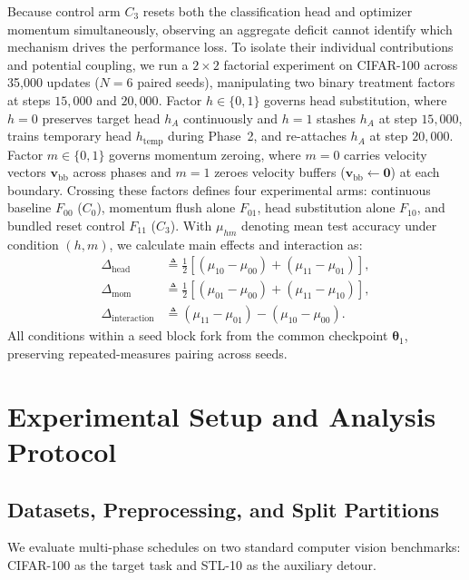 \documentclass[sn-mathphys,Numbered]{sn-jnl}
\begin{document}
Because control arm $C_3$ resets both the classification head and optimizer momentum simultaneously, observing an aggregate deficit cannot identify which mechanism drives the performance loss. To isolate their individual contributions and potential coupling, we run a $2 \times 2$ factorial experiment on CIFAR-100 across 35,000 updates ($N = 6$ paired seeds), manipulating two binary treatment factors at steps $15{,}000$ and $20{,}000$. Factor $h \in \{0, 1\}$ governs head substitution, where $h = 0$ preserves target head $h_A$ continuously and $h = 1$ stashes $h_A$ at step $15{,}000$, trains temporary head $h_{\mathrm{temp}}$ during Phase~2, and re-attaches $h_A$ at step $20{,}000$. Factor $m \in \{0, 1\}$ governs momentum zeroing, where $m = 0$ carries velocity vectors $\bm{v}_{\mathrm{bb}}$ across phases and $m = 1$ zeroes velocity buffers ($\bm{v}_{\mathrm{bb}} \leftarrow \mathbf{0}$) at each boundary. Crossing these factors defines four experimental arms: continuous baseline $F_{00}$ ($C_0$), momentum flush alone $F_{01}$, head substitution alone $F_{10}$, and bundled reset control $F_{11}$ ($C_3$). With $\mu_{hm}$ denoting mean test accuracy under condition $(h, m)$, we calculate main effects and interaction as:
\begin{align}
    \Delta_{\mathrm{head}} &\triangleq \frac{1}{2} \left[ (\mu_{10} - \mu_{00}) + (\mu_{11} - \mu_{01}) \right], \label{eq:factorial_head} \\
    \Delta_{\mathrm{mom}}  &\triangleq \frac{1}{2} \left[ (\mu_{01} - \mu_{00}) + (\mu_{11} - \mu_{10}) \right], \label{eq:factorial_mom} \\
    \Delta_{\mathrm{interaction}} &\triangleq (\mu_{11} - \mu_{01}) - (\mu_{10} - \mu_{00}). \label{eq:factorial_interaction}
\end{align}
All conditions within a seed block fork from the common checkpoint $\bm{\theta}_1$, preserving repeated-measures pairing across seeds.

\clearpage
\section{Experimental Setup and Analysis Protocol}\label{sec:protocol}

\subsection{Datasets, Preprocessing, and Split Partitions}\label{subsec:protocol_datasets}

We evaluate multi-phase schedules on two standard computer vision benchmarks: CIFAR-100 \cite{krizhevsky2009cifar} as the target task and STL-10 \cite{coates2011stl10} as the auxiliary detour.
\end{document}
